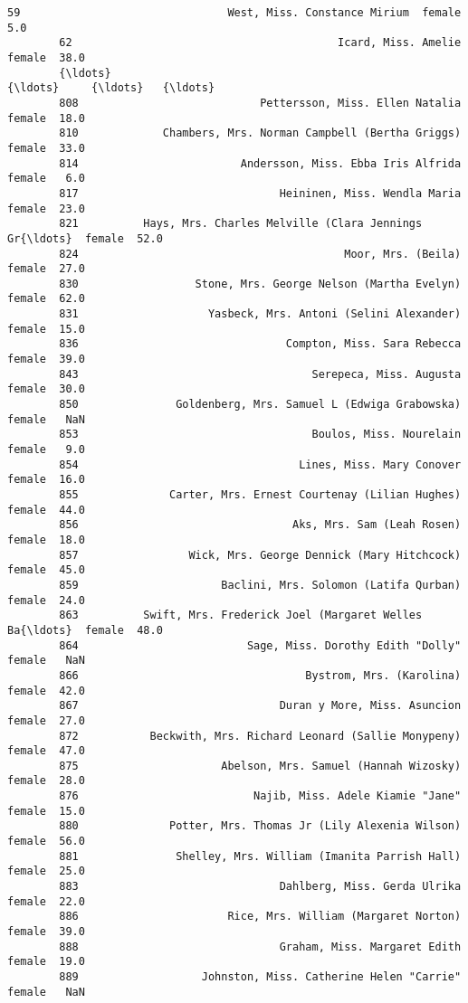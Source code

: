 \documentclass[11pt]{article}
\begin{document}
\begin{Verbatim}[commandchars=\\\{\}]
        59                                West, Miss. Constance Mirium  female   5.0   
        62                                         Icard, Miss. Amelie  female  38.0   
        {\ldots}                                                        {\ldots}     {\ldots}   {\ldots}   
        808                            Pettersson, Miss. Ellen Natalia  female  18.0   
        810             Chambers, Mrs. Norman Campbell (Bertha Griggs)  female  33.0   
        814                         Andersson, Miss. Ebba Iris Alfrida  female   6.0   
        817                               Heininen, Miss. Wendla Maria  female  23.0   
        821          Hays, Mrs. Charles Melville (Clara Jennings Gr{\ldots}  female  52.0   
        824                                         Moor, Mrs. (Beila)  female  27.0   
        830                  Stone, Mrs. George Nelson (Martha Evelyn)  female  62.0   
        831                    Yasbeck, Mrs. Antoni (Selini Alexander)  female  15.0   
        836                                Compton, Miss. Sara Rebecca  female  39.0   
        843                                    Serepeca, Miss. Augusta  female  30.0   
        850               Goldenberg, Mrs. Samuel L (Edwiga Grabowska)  female   NaN   
        853                                    Boulos, Miss. Nourelain  female   9.0   
        854                                  Lines, Miss. Mary Conover  female  16.0   
        855              Carter, Mrs. Ernest Courtenay (Lilian Hughes)  female  44.0   
        856                                 Aks, Mrs. Sam (Leah Rosen)  female  18.0   
        857                 Wick, Mrs. George Dennick (Mary Hitchcock)  female  45.0   
        859                      Baclini, Mrs. Solomon (Latifa Qurban)  female  24.0   
        863          Swift, Mrs. Frederick Joel (Margaret Welles Ba{\ldots}  female  48.0   
        864                          Sage, Miss. Dorothy Edith "Dolly"  female   NaN   
        866                                   Bystrom, Mrs. (Karolina)  female  42.0   
        867                               Duran y More, Miss. Asuncion  female  27.0   
        872           Beckwith, Mrs. Richard Leonard (Sallie Monypeny)  female  47.0   
        875                      Abelson, Mrs. Samuel (Hannah Wizosky)  female  28.0   
        876                           Najib, Miss. Adele Kiamie "Jane"  female  15.0   
        880              Potter, Mrs. Thomas Jr (Lily Alexenia Wilson)  female  56.0   
        881               Shelley, Mrs. William (Imanita Parrish Hall)  female  25.0   
        883                               Dahlberg, Miss. Gerda Ulrika  female  22.0   
        886                       Rice, Mrs. William (Margaret Norton)  female  39.0   
        888                               Graham, Miss. Margaret Edith  female  19.0   
        889                   Johnston, Miss. Catherine Helen "Carrie"  female   NaN   
        

\end{Verbatim}
\end{document}
